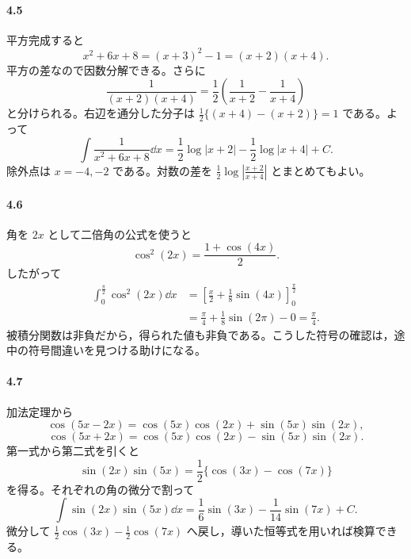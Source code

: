 \paragraph{4.5}
平方完成すると
\[
 x^2+6x+8=(x+3)^2-1=(x+2)(x+4).
\]
平方の差なので因数分解できる。さらに
\[
 \frac1{(x+2)(x+4)}
 =\frac12\left(\frac1{x+2}-\frac1{x+4}\right)
\]
と分けられる。右辺を通分した分子は $\frac12\{(x+4)-(x+2)\}=1$ である。よって
\[
 \int\frac1{x^2+6x+8}\dd x
 =\frac12\log|x+2|-\frac12\log|x+4|+C.
\]
除外点は $x=-4,-2$ である。対数の差を $\frac12\log\left|\frac{x+2}{x+4}\right|$ とまとめてもよい。

\paragraph{4.6}
角を $2x$ として二倍角の公式を使うと
\[
 \cos^2(2x)=\frac{1+\cos(4x)}2.
\]
したがって
\[
\begin{aligned}
 \int_0^{\frac\pi2}\cos^2(2x)\dd x
 &=\left[\frac x2+\frac18\sin(4x)\right]_0^{\frac\pi2}\\
 &=\frac\pi4+\frac18\sin(2\pi)-0=\frac\pi4.
\end{aligned}
\]
被積分関数は非負だから，得られた値も非負である。こうした符号の確認は，途中の符号間違いを見つける助けになる。

\paragraph{4.7}
加法定理から
\[
 \cos(5x-2x)=\cos(5x)\cos(2x)+\sin(5x)\sin(2x),
\]
\[
 \cos(5x+2x)=\cos(5x)\cos(2x)-\sin(5x)\sin(2x).
\]
第一式から第二式を引くと
\[
 \sin(2x)\sin(5x)=\frac12\{\cos(3x)-\cos(7x)\}
\]
を得る。それぞれの角の微分で割って
\[
 \int\sin(2x)\sin(5x)\dd x
 =\frac16\sin(3x)-\frac1{14}\sin(7x)+C.
\]
微分して $\frac12\cos(3x)-\frac12\cos(7x)$ へ戻し，導いた恒等式を用いれば検算できる。
